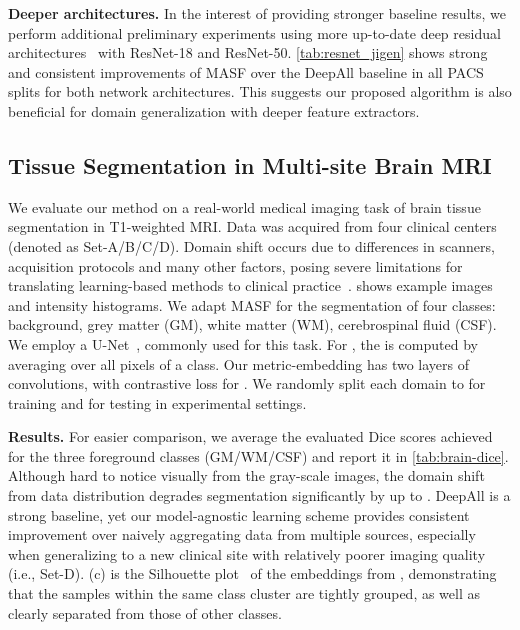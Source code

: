 \documentclass{article}
\begin{document}
\textbf{Deeper architectures.}
In the interest of providing stronger baseline results, we perform additional preliminary experiments using more up-to-date deep residual architectures~\cite{he2016resnet} with ResNet-18 and ResNet-50.
\cref{tab:resnet_jigen} shows strong and consistent improvements of MASF over the DeepAll baseline in all PACS splits for both network architectures. This suggests our proposed algorithm is also beneficial for domain generalization with deeper feature extractors.



\subsection{Tissue Segmentation in Multi-site Brain MRI}
\label{sec:exp_brain}

We evaluate our method on a real-world medical imaging task of brain tissue segmentation in T1-weighted MRI. Data was acquired from four clinical centers (denoted as Set-A/B/C/D). Domain shift occurs due to differences in scanners, acquisition protocols and many other factors, posing severe limitations for translating learning-based methods to clinical practice~\cite{glocker2019multisite}.  shows example images and intensity histograms.
We adapt MASF for the segmentation of four classes: background, grey matter (GM), white matter (WM), cerebrospinal fluid (CSF). We employ a U-Net~\citep{ronneberger2015u}, commonly used for this task. 
For , the  is computed by averaging over all pixels of a class.
Our metric-embedding has two layers of  convolutions, with contrastive loss for .
We randomly split each domain to  for training and  for testing in experimental settings.



\textbf{Results.} For easier comparison, we average the evaluated Dice scores achieved for the three foreground classes (GM/WM/CSF) and report it in \cref{tab:brain-dice}.
Although hard to notice visually from the gray-scale images, the domain shift from data distribution degrades segmentation significantly by up to . DeepAll is a strong baseline, yet our model-agnostic learning scheme provides consistent improvement over naively aggregating data from multiple sources, especially when generalizing to a new clinical site with relatively poorer imaging quality (i.e., Set-D).
 (c) is the Silhouette plot~\citep{rousseeuw1987silhouettes} of the embeddings from , demonstrating that the samples within the same class cluster are tightly grouped, as well as clearly separated from those of other classes.
\end{document}
